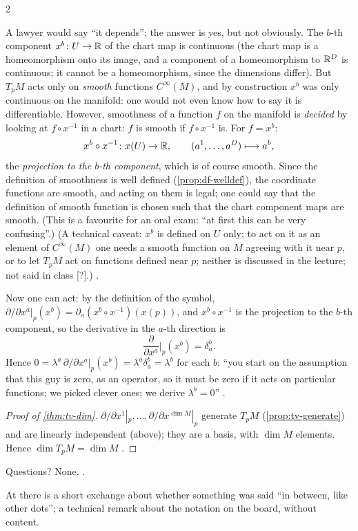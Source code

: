 \begin{paracol}{2}
\begin{remark}\label{rem:tv-legal}
A lawyer would say ``it depends''; the answer is yes, but not obviously. The $b$-th component $x^b\colon U\to\mathbb{R}$ of the chart map is continuous (the chart map is a homeomorphism onto its image, and a component of a homeomorphism to $\mathbb{R}^D$ is continuous; it cannot be a homeomorphism, since the dimensions differ). But $T_pM$ acts only on
\emph{smooth} functions $C^\infty(M)$, and by construction $x^b$ was only continuous on the manifold: one would not even know how to say it is differentiable. However, smoothness of a function $f$ on the manifold is \emph{decided} by looking at $f\circ x^{-1}$ in a chart: $f$ is smooth if $f\circ x^{-1}$ is. For $f=x^b$:
\[
  x^b\circ x^{-1}\colon x(U)\to\mathbb{R},\qquad(a^1,\dots,a^D)\longmapsto a^b,
\]
the \emph{projection to the $b$-th component}, which is of course smooth. Since the definition of smoothness is well defined (\cref{prop:df-welldef}), the coordinate functions are smooth, and acting on them is legal; one could say that the definition of smooth function is chosen such that the chart component maps are smooth.
(This is a favourite for an oral exam: ``at first this can be very confusing''.) (A technical caveat: $x^b$ is defined on $U$ only; to act on it as an element of $C^\infty(M)$ one needs a smooth function on $M$ agreeing with it near $p$, or to let $T_pM$ act on functions defined near $p$; neither is discussed in the lecture; not said in class [?].)
     .
\end{remark}
Now one can act: by the definition of the symbol, $\partial/\partial x^a|_p(x^b)=\partial_a(x^b\circ x^{-1})(x(p))$, and $x^b\circ x^{-1}$ is the projection to the $b$-th component, so the derivative in the $a$-th direction is
\[
  \frac{\partial}{\partial x^a}\Bigr|_p(x^b)=\delta^b_a.
\]
Hence $0=\lambda^a\,\partial/\partial x^a|_p(x^b)=\lambda^a\delta^b_a=\lambda^b$ for each $b$: ``you start on the assumption that this guy is zero, as an operator, so it must be zero if it acts on particular functions; we picked clever ones; we derive $\lambda^b=0$''      .
\begin{proof}[Proof of \cref{thm:tv-dim}]
$\partial/\partial x^1|_p,\dots,\partial/\partial x^{\dim M}|_p$ generate $T_pM$ (\cref{prop:tv-generate}) and are linearly independent (above); they are a basis, with $\dim M$ elements. Hence $\dim T_pM=\dim M$  .
\end{proof}
Questions? None.  .
\begin{coursenote}
At  there is a short exchange about whether something was said ``in between, like other dots''; a technical remark about the notation on the board, without content.
\end{coursenote}


\end{paracol}
